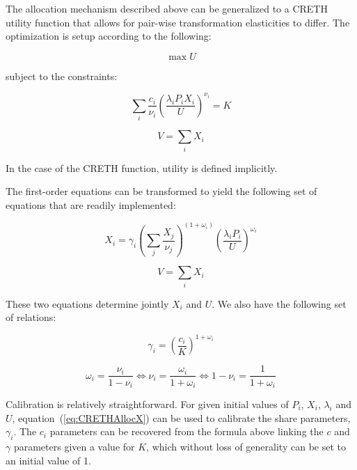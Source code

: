 The allocation mechanism described above can be generalized to a CRETH utility
function that allows for pair-wise transformation elasticities to differ.
The optimization is setup according to the following:

\begin{displaymath}
\max U
\end{displaymath}

\noindent subject to the constraints:

\begin{displaymath}
\sum_i{\frac{c_i}{\nu_i} \left( \frac{\lambda_i P_i X_i}{U}\right)^{\nu_i}} = K
\end{displaymath}

\begin{displaymath}
V=\sum\limits_{i} {X_i}
\end{displaymath}

\noindent In the case of the CRETH function, utility is defined implicitly.

The first-order equations can be transformed to yield the following set of
equations that are readily implemented:

\begin{equation}
\label{eq:CRETHAllocX}
X_i = \gamma_i \left(\sum_j{\frac{X_j}{\nu_j}} \right)^{(1+\omega_i)}
\left( \frac{\lambda_i P_i}{U}\right)^{\omega_i}
\end{equation}

\begin{equation}
\label{eq:CRETHAllocU}
V = \sum_i {X_i}
\end{equation}

\noindent These two equations determine jointly $X_i$ and $U$. We also have the following
set of relations:

\begin{displaymath}
\gamma_i = \left( \frac{c_i}{K} \right)^{1+\omega_i}
\end{displaymath}

\begin{displaymath}
\omega_i=\frac{\nu_i}{1-\nu_i} \iff \nu_i=\frac{\omega_i}{1+\omega_i} \iff 1-\nu_i=\frac{{1}}{1+\omega_i}
\end{displaymath}

Calibration is relatively straightforward. For given initial values
of $P_i$, $X_i$, $\lambda_i$ and $U$, equation~(\ref{eq:CRETHAllocX})
can be used to calibrate the share parameters, $\gamma_i$. The
$c_i$ parameters can be recovered from the formula above linking
the $c$ and $\gamma$ parameters given a value for $K$, which without
loss of generality can be set to an initial value of 1.

